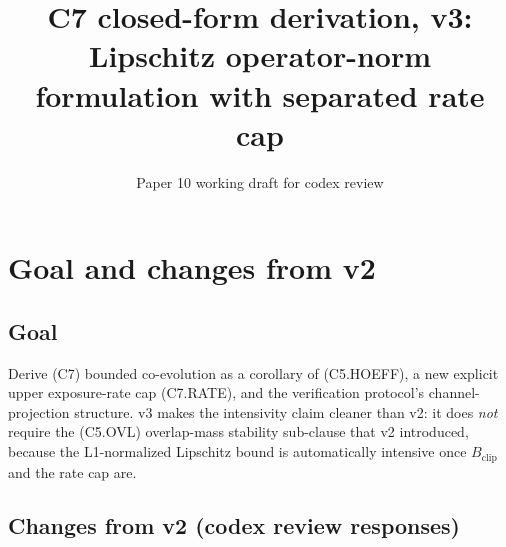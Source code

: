 \documentclass{article}
\title{C7 closed-form derivation, v3: \\
Lipschitz operator-norm formulation with separated rate cap}
\author{Paper 10 working draft for codex review}
\date{}
\newcommand{\Bclip}{B_{\mathrm{clip}}}
\begin{document}
\maketitle

\section{Goal and changes from v2}

\subsection{Goal}

Derive (C7) bounded co-evolution as a corollary of (C5.HOEFF), a
new explicit upper exposure-rate cap (C7.RATE), and the
verification protocol's channel-projection structure.  v3 makes
the intensivity claim cleaner than v2: it does \emph{not} require
the (C5.OVL) overlap-mass stability sub-clause that v2 introduced,
because the L1-normalized Lipschitz bound is automatically
intensive once $\Bclip$ and the rate cap are.

\subsection{Changes from v2 (codex review responses)}
\end{document}
